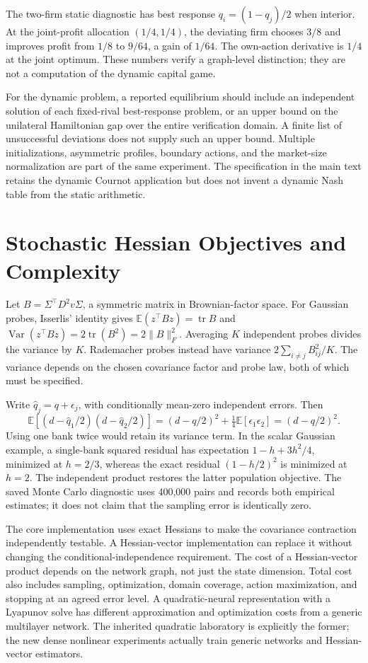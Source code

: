 \documentclass[ecta,nameyear,draft]{econsocart}
\theoremstyle{definition}
\theoremstyle{remark}
\newcommand{\E}{\mathbb E}
\newcommand{\tr}{\operatorname{tr}}
\begin{document}
The two-firm static diagnostic has best response $q_i=(1-q_j)/2$ when interior. At the joint-profit allocation $(1/4,1/4)$, the deviating firm chooses $3/8$ and improves profit from $1/8$ to $9/64$, a gain of $1/64$. The own-action derivative is $1/4$ at the joint optimum. These numbers verify a graph-level distinction; they are not a computation of the dynamic capital game.

For the dynamic problem, a reported equilibrium should include an independent solution of each fixed-rival best-response problem, or an upper bound on the unilateral Hamiltonian gap over the entire verification domain. A finite list of unsuccessful deviations does not supply such an upper bound. Multiple initializations, asymmetric profiles, boundary actions, and the market-size normalization are part of the same experiment. The specification in the main text retains the dynamic Cournot application but does not invent a dynamic Nash table from the static arithmetic.

\section{Stochastic Hessian Objectives and Complexity}
Let $B=\Sigma^\top D^2v\Sigma$, a symmetric matrix in Brownian-factor space. For Gaussian probes, Isserlis' identity gives $\E(z^\top Bz)=\tr B$ and $\operatorname{Var}(z^\top Bz)=2\tr(B^2)=2\|B\|_F^2$. Averaging $K$ independent probes divides the variance by $K$. Rademacher probes instead have variance $2\sum_{i\ne j}B_{ij}^2/K$. The variance depends on the chosen covariance factor and probe law, both of which must be specified.

Write $\widehat q_j=q+\epsilon_j$, with conditionally mean-zero independent errors. Then
\[
 \E[(d-\widehat q_1/2)(d-\widehat q_2/2)]
 =(d-q/2)^2+\tfrac14\E[\epsilon_1\epsilon_2]=(d-q/2)^2.
\]
Using one bank twice would retain its variance term. In the scalar Gaussian example, a single-bank squared residual has expectation $1-h+3h^2/4$, minimized at $h=2/3$, whereas the exact residual $(1-h/2)^2$ is minimized at $h=2$. The independent product restores the latter population objective. The saved Monte Carlo diagnostic uses 400,000 pairs and records both empirical estimates; it does not claim that the sampling error is identically zero.

The core implementation uses exact Hessians to make the covariance contraction independently testable. A Hessian-vector implementation can replace it without changing the conditional-independence requirement. The cost of a Hessian-vector product depends on the network graph, not just the state dimension. Total cost also includes sampling, optimization, domain coverage, action maximization, and stopping at an agreed error level. A quadratic-neural representation with a Lyapunov solve has different approximation and optimization costs from a generic multilayer network. The inherited quadratic laboratory is explicitly the former; the new dense nonlinear experiments actually train generic networks and Hessian-vector estimators.
\end{document}
